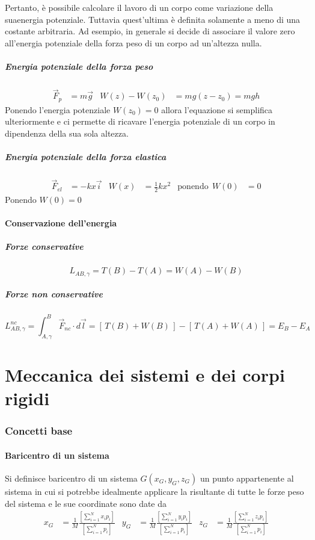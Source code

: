 \documentclass[12pt,a4paper]{report}
\begin{document}
Pertanto, è possibile calcolare il lavoro di un corpo come variazione della suaenergia potenziale. Tuttavia  quest'ultima è definita solamente a meno di una costante arbitraria. 
Ad esempio, in generale si decide di associare il valore zero all'energia potenziale della forza peso di un corpo ad un'altezza nulla.
			\paragraph{Energia potenziale della forza peso}
			\begin{align*}
			\vec{F}_{p} &= m\vec{g} & W(z)-W(z_{0}) &= mg(z-z_{0}) = mgh			
			\end{align*}
Ponendo l'energia potenziale $W(z_{0})=0$ allora l'equazione si semplifica ulteriormente e ci permette di ricavare l'energia potenziale di un corpo in dipendenza della sua sola altezza.
			\paragraph{Energia potenziale della forza elastica}
			\begin{align*}
			\vec{F}_{el} &= -kx\vec{i} & W(x) &= \frac{1}{2}kx^{2} 	& \text{ponendo} ~~ W(0)&=0		
			\end{align*}
Ponendo $W(0)=0$
		\subsubsection{Conservazione dell'energia}
			\paragraph{Forze conservative}
			\[\textit{L}_{AB,\gamma}= T(B)-T(A)= W(A)-W(B) \]
			\paragraph{Forze non conservative}
			\[\textit{L}^{nc}_{AB,\gamma}= \int_{A,\gamma}^B \vec{F}_{nc} \cdot d\vec{l} = [\,T(B)+W(B)\,]-[\,T(A)+W(A)\,]=E_{B}-E_{A} \]
\chapter{Meccanica dei sistemi e dei corpi rigidi}
	\subsection{Concetti base}
		\subsubsection{Baricentro di un sistema}	
Si definisce baricentro di un sistema $G(x_{G},y_{G},z_{G})$ un punto appartenente al sistema in cui si potrebbe idealmente applicare la risultante di tutte le forze peso del sistema e le sue coordinate sono date da
		\begin{align*} 
		 x_{G} &= \frac{1}{M} \frac{[\sum\limits_{i=1}^N x_{i} p_{i}]}{[\sum\limits_{i=1}^N p_{i}]}   &  y_{G} &= \frac{1}{M} \frac{[\sum\limits_{i=1}^N y_{i}p_{i}]}{[\sum\limits_{i=1}^N p_{i}]} & z_{G}&= \frac{1}{M} \frac{[\sum\limits_{i=1}^N z_{i}p_{i}]}{[\sum\limits_{i=1}^N p_{i}]} 
		\end{align*}
		
\end{document}
